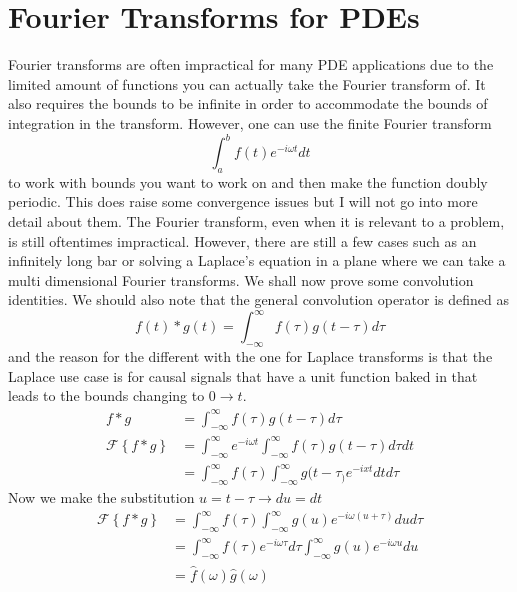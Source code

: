 \documentclass{report}
\theoremstyle{definition}
\theoremstyle{remark}
\newcommand{\ft}[1]{\mathscr{F}\left\{ #1\right\}}
\begin{document}
\section{Fourier Transforms for PDEs}
Fourier transforms are often impractical for many PDE applications due to the limited amount of functions you can actually take the Fourier transform of. It also requires the bounds to be infinite in order to accommodate the bounds of integration in the transform. However, one can use the finite Fourier transform
\begin{equation*}
    \int^b_af(t)e^{-i\omega t}dt
\end{equation*}
to work with bounds you want to work on and then make the function doubly periodic. This does raise some convergence issues but I will not go into more detail about them. The Fourier transform, even when it is relevant to a problem, is still oftentimes impractical. However, there are still a few cases such as an infinitely long bar or solving a Laplace's equation in a plane where we can take a multi dimensional Fourier transforms. We shall now prove some convolution identities. We should also note that the general convolution operator is defined as 
\begin{equation*}
    f(t)*g(t)=\int^\infty_{-\infty}f(\tau)g(t-\tau)d\tau
\end{equation*}
and the reason for the different with the one for Laplace transforms is that the Laplace use case is for causal signals that have a unit function baked in that leads to the bounds changing to $0\rightarrow t$.
\begin{equation*}
    \begin{split}
        f*g &=\int^\infty_{-\infty}f(\tau)g(t-\tau)d\tau \\
        \ft{f*g}&= \int^\infty_{-\infty} e^{-i\omega t}\int^\infty_{-\infty}f(\tau)g(t-\tau)d\tau dt\\
        &=\int^\infty_{-\infty}f(\tau)\int^\infty_{-\infty} g(t-\tau_) e^{-ixt}dt d\tau
    \end{split}
\end{equation*}
Now we make the substitution $u=t-\tau \rightarrow du=dt$
\begin{equation*}
    \begin{split}
        \ft{f*g}&= \int^\infty_{-\infty}f(\tau)\int^\infty_{-\infty} g(u)e^{-i\omega(u+\tau)}dud\tau\\
        &=\int^\infty_{-\infty}f(\tau)e^{-i\omega \tau}d\tau \int^\infty_{-\infty}g(u)e^{-i\omega u}du\\
        &=\hat{f}(\omega)\hat{g}(\omega )
    \end{split}
\end{equation*}
\end{document}
